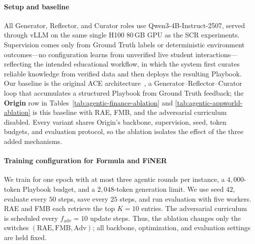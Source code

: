 \documentclass[10pt,conference]{IEEEtran}
\begin{document}
\paragraph{Setup and baseline}
All Generator, Reflector, and Curator roles use Qwen3-4B-Instruct-2507,
served through vLLM on the same single H100 80\,GB GPU as the SCR
experiments. Supervision comes only from Ground Truth labels or
deterministic environment outcomes---no configuration learns from
unverified live student interactions---reflecting the intended
educational workflow, in which the system first curates reliable
knowledge from verified data and then deploys the resulting Playbook. Our
baseline is the original ACE architecture~\cite{agenticcontext2026}, a
Generator--Reflector--Curator loop that accumulates a structured Playbook
from Ground Truth feedback; the \textbf{Origin} row in
Tables~\ref{tab:agentic-finance-ablation} and
\ref{tab:agentic-appworld-ablation} is this baseline with RAE, FMB, and
the adversarial curriculum disabled. Every variant shares Origin's
backbone, supervision, seed, token budgets, and evaluation protocol, so
the ablation isolates the effect of the three added mechanisms.

\paragraph{Training configuration for Formula and FiNER}
We train for one epoch with at most three agentic
rounds per instance, a $4{,}000$-token Playbook budget, and a
$2{,}048$-token generation limit. We use seed $42$, evaluate every
$50$ steps, save every $25$ steps, and run evaluation with five workers.
RAE and FMB each retrieve the top $K=10$ entries. The
adversarial curriculum is scheduled every $f_{\mathrm{adv}}=10$ update
steps. Thus, the ablation changes only the switches
$(\mathrm{RAE},\mathrm{FMB},\mathrm{Adv})$; all backbone, optimization,
and evaluation settings are held fixed.
\end{document}
